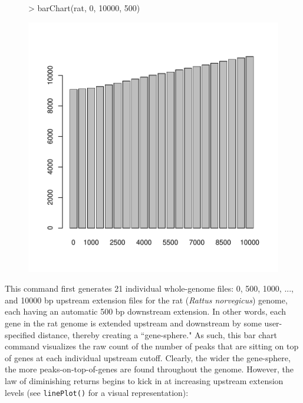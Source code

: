 \documentclass[12pt]{article}
\begin{document}
\begin{figure}[H]
\begin{center}
\begin{Schunk}
\begin{Sinput}
> barChart(rat, 0, 10000, 500)
\end{Sinput}
\end{Schunk}
\includegraphics{geneXtendeR-015}
\end{center}
\end{figure}

This command first generates 21 individual whole-genome files: 0, 500, 1000, ..., and 10000 bp upstream extension files for the rat (\emph{Rattus norvegicus}) genome, each having an automatic 500 bp downstream extension.  In other words, each gene in the rat genome is extended upstream and downstream by some user-specified distance, thereby creating a ``gene-sphere."  As such, this bar chart command visualizes the raw count of the number of peaks that are sitting on top of genes at each individual upstream cutoff.  Clearly, the wider the gene-sphere, the more peaks-on-top-of-genes are found throughout the genome.  However, the law of diminishing returns begins to kick in at increasing upstream extension levels (see \texttt{linePlot()} for a visual representation):
\end{document}
